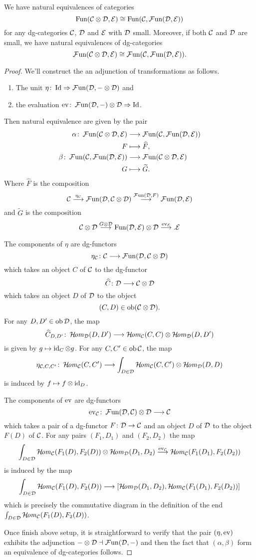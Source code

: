 \begin{proposition}
We have natural equivalences of categories
\[
\Fun(\Cc\otimes\Dd,\Ee)\cong\Fun(\Cc,\FFun(\Dd,\Ee))
\]
for any dg-categories $\Cc$, $\Dd$ and $\Ee$ with $\Dd$ small. 
Moreover, if both $\Cc$ and $\Dd$ are small, we have 
natural equivalences of dg-categories
\[
\FFun(\Cc\otimes\Dd,\Ee)\cong\FFun(\Cc,\FFun(\Dd,\Ee)).
\]
\end{proposition}
\begin{proof}
We'll construct the an adjunction 
of transformations as follows.
\begin{enumerate}
\item 
The unit 
$\eta\colon\Id\then\FFun(\Dd,-\otimes\Dd)$
and 
\item 
the evaluation 
$\ev\colon\FFun(\Dd,-)\otimes\Dd\then\Id$.
\end{enumerate}
Then natural equivalence are given by the pair
\begin{align*}
\alpha\colon 
\FFun(\Cc\otimes\Dd,\Ee) & \longrightarrow 
\FFun(\Cc,\FFun(\Dd,\Ee)) \\
F & \longmapsto \widehat{F}, \\
\beta\colon 
\FFun(\Cc,\FFun(\Dd,\Ee)) & \longrightarrow 
\FFun(\Cc\otimes\Dd,\Ee) \\
G & \longmapsto \widetilde{G}.
\end{align*}
Where $\widehat{F}$ is the composition
\[
\Cc\markar{\eta_{\Cc}}
\FFun(\Dd,\Cc\otimes\Dd)
\markar{\FFun(\Dd,F)}
\FFun(\Dd,\Ee)
\]
and $\widetilde{G}$ is the composition
\[
\Cc\otimes\Dd
\markar{G\otimes\Dd}
\Fun(\Dd,\Ee)\otimes\Dd
\markar{\ev_{\Ee}}.
\Ee
\]

The components of $\eta$ are dg-functors
\[
\eta_{\Cc}\colon\Cc\To\FFun(\Dd,\Cc\otimes\Dd)
\]
which takes an object $C$ of $\Cc$ to the dg-functor 
\[
\widehat{C}\colon\Dd\To\Cc\otimes\Dd
\]
which takes an object $D$ of $\Dd$ to the object
\[
(C,D)\in\ob(\Cc\otimes\Dd).
\]
For any $D,D'\in\ob\Dd$, the map 
\[
\widehat{C}_{D,D'}\colon
\HHom_{\Dd}(D,D')\To
\HHom_{\Cc}(C,C)\otimes\HHom_{\Dd}(D,D')
\]
is given by $g\mapsto\id_C\otimes{g}$.
For any $C,C'\in\ob\Cc$, the map
\[
\eta_{\Cc,C,C'}\colon
\HHom_{\Cc}(C,C')\To
\int_{D\in\Dd}\HHom_{\Cc}(C,C')\otimes\HHom_{\Dd}(D,D)
\]
is induced by $f\mapsto{f}\otimes\id_D$.

The components of $\ev$ are dg-functors
\[
\ev_{\Cc}\colon\FFun(\Dd,\Cc)\otimes\Dd\To\Cc
\]
which takes a pair of a dg-functor $F\colon\Dd\to\Cc$ 
and an object $D$ of $\Dd$ 
to the object $F(D)$ of $\Cc$. 
For any pairs $(F_1,D_1)$ and $(F_2,D_2)$ 
the map 
\[
\int_{D\in\Dd}\HHom_{\Cc}(F_1(D),F_2(D))
\otimes\HHom_{\Dd}(D_1,D_2)
\markar{\ev_{\Cc}}\HHom_{\Cc}(F_1(D_1),F_2(D_2))
\]
is induced by the map
\[
\int_{D\in\Dd}\HHom_{\Cc}(F_1(D),F_2(D))
\To
[\HHom_{\Dd}(D_1,D_2),\HHom_{\Cc}(F_1(D_1),F_2(D_2))]
\]
which is precisely the commutative diagram in 
the definition of the end
$\int_{D\in\Dd}\HHom_{\Cc}(F_1(D),F_2(D))$.

Once finish above setup, it is straightforward 
to verify that the pair $(\eta,\ev)$ exhibits the 
adjunction $-\otimes\Dd\dashv\FFun(\Dd,-)$ 
and then the fact that $(\alpha,\beta)$ form 
an equivalence of dg-categories follows.
\end{proof}


